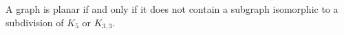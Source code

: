 

\setcounter{section}{3}
\setcounter{subsection}{3}
\setcounter{dfn}{9}

\begin{thm}[Kuratowski]
A graph is planar if and only if it does not contain a subgraph isomorphic to a subdivision of $K_5$ or $K_{3,3}$.
\end{thm}


